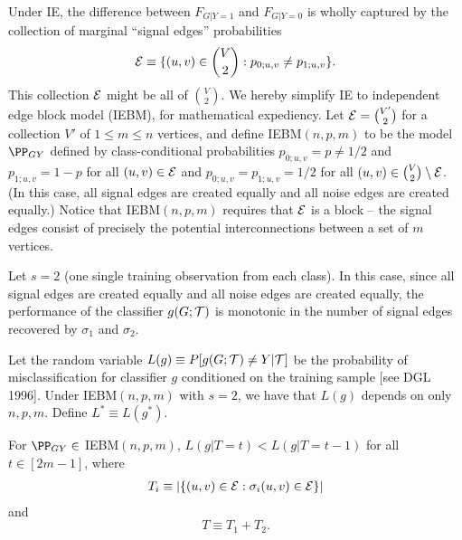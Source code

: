 
Under IE,
the difference between
$F_{G|Y=1}$ and $F_{G|Y=0}$
is wholly captured by the collection of marginal ``signal edges'' probabilities
$$\mathcal{E} \equiv \{(u,v) \in {V \choose 2}: p_{0;u,v} \neq p_{1;u,v}\}.$$
This collection $\mathcal{E}$ might be all of ${V \choose 2}$.
We hereby simplify IE to independent edge block model (IEBM), for mathematical expediency.
Let $\mathcal{E} = {V' \choose 2}$ for a collection $V'$ of $1 \leq m \leq n$ vertices,
and define
IEBM$(n,p,m)$ to be the model $\PP_{GY}$ defined by class-conditional probabilities
$p_{0;u,v}=p \neq 1/2$ and $p_{1;u,v}=1-p$ for all $(u,v) \in \mathcal{E}$
and $p_{0;u,v}=p_{1;u,v}=1/2$ for all $(u,v) \in {V \choose 2} \setminus \mathcal{E}$.
(In this case, all signal edges are created equally and all noise edges are created equally.)
Notice that
IEBM$(n,p,m)$ requires that $\mathcal{E}$ is a block --
the signal edges consist of precisely the potential interconnections between a set of $m$ vertices.


Let $s=2$ (one single training observation from each class).
In this case, since all signal edges are created equally and all noise edges are created equally,
the performance of the classifier $g(G;\mathcal{T})$
is monotonic in the number of signal edges recovered by $\sigma_1$ and $\sigma_2$.


Let the random variable $L(g) \equiv P[g(G;\mathcal{T}) \neq Y| \mathcal{T}]$
be the probability of misclassification for classifier $g$
conditioned on the training sample [see DGL 1996].
Under IEBM$(n,p,m)$ with $s=2$, we have that $L(g)$ depends on only $n,p,m$.
Define $L^* \equiv L(g^*)$.

\thma
For $\PP_{GY} \in$ IEBM$(n,p,m)$,
$L(g|T=t) < L(g|T=t-1)$ for all $t \in [2m-1]$,
where
\begin{eqnarray}
T_i \equiv |\{(u,v) \in \mathcal{E}: \sigma_i(u,v) \in \mathcal{E}\}|
\end{eqnarray}
and
$$T \equiv T_1 + T_2.$$
\thmb


